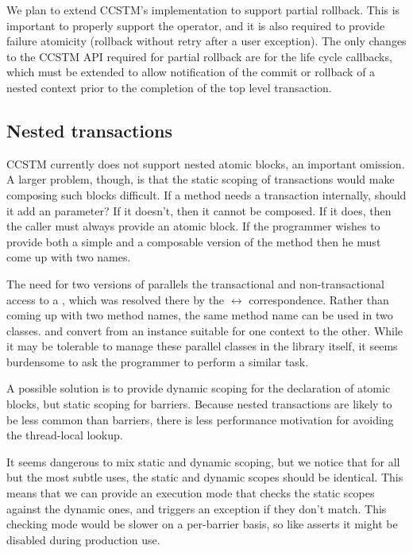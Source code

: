 We plan to extend CCSTM's implementation to support partial rollback.
This is important to properly support the  operator, and
it is also required to provide failure atomicity (rollback without retry
after a user exception).  The only changes to the CCSTM API required
for partial rollback are for the life cycle callbacks, which must be
extended to allow notification of the commit or rollback of a nested
context prior to the completion of the top level transaction.

\color{green}
\subsection{Nested transactions}

CCSTM currently does not support nested atomic blocks, an important
omission.  A larger problem, though, is that the static scoping
of transactions would make composing such blocks difficult.  If a
method  needs a transaction internally, should it add an
  parameter?  If it doesn't, then it
cannot be composed.  If it does, then the caller must always provide
an atomic block.  If the programmer wishes to provide both a simple
and a composable version of the method then he must come up with
two names.

The need for two versions of  parallels the transactional and
non-transactional access to a , which was resolved there by the
 $\leftrightarrow$  correspondence.  Rather than
coming up with two method names, the same method name can be used in
two classes.   and 
convert from an instance suitable for one context to the other.  While it
may be tolerable to manage these parallel classes in the library itself,
it seems burdensome to ask the programmer to perform a similar task.

A possible solution is to provide dynamic scoping for the declaration
of atomic blocks, but static scoping for barriers.  Because nested
transactions are likely to be less common than barriers, there is less
performance motivation for avoiding the thread-local lookup.

It seems dangerous to mix static and dynamic scoping, but we notice that
for all but the most subtle uses, the static and dynamic scopes should be
identical.  This means that we can provide an execution mode that checks
the
static scopes against the dynamic ones, and triggers an exception 
if they don't match.  This checking mode would be slower on a per-barrier
basis, so like asserts it might be disabled during production use.

